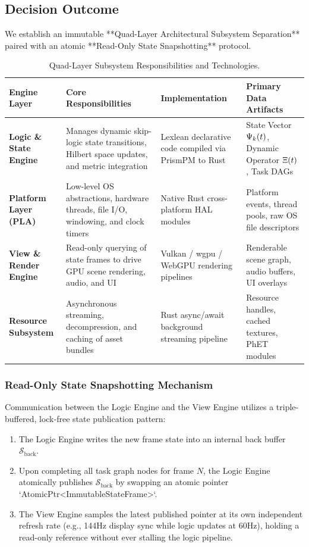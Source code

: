\subsection{Decision Outcome}
We establish an immutable **Quad-Layer Architectural Subsystem Separation** paired with an atomic **Read-Only State Snapshotting** protocol.

\begin{table}[htbp]
\centering
\small
\begin{tabularx}{\textwidth}{l p{4.2cm} p{3.8cm} X}
\toprule
\textbf{Engine Layer} & \textbf{Core Responsibilities} & \textbf{Implementation} & \textbf{Primary Data Artifacts} \\
\midrule
\textbf{Logic \& State Engine} & Manages dynamic skip-logic state transitions, Hilbert space updates, and metric integration & Lexlean declarative code compiled via PrismPM to Rust & State Vector $\Psi_k(t)$, Dynamic Operator $\Xi(t)$, Task DAGs \\
\addlinespace
\textbf{Platform Layer (PLA)} & Low-level OS abstractions, hardware threads, file I/O, windowing, and clock timers & Native Rust cross-platform HAL modules & Platform events, thread pools, raw OS file descriptors \\
\addlinespace
\textbf{View \& Render Engine} & Read-only querying of state frames to drive GPU scene rendering, audio, and UI & Vulkan / wgpu / WebGPU rendering pipelines & Renderable scene graph, audio buffers, UI overlays \\
\addlinespace
\textbf{Resource Subsystem} & Asynchronous streaming, decompression, and caching of asset bundles & Rust async/await background streaming pipeline & Resource handles, cached textures, PhET modules \\
\bottomrule
\end{tabularx}
\caption{Quad-Layer Subsystem Responsibilities and Technologies.}
\label{tab:subsystem_matrix}
\end{table}

\subsubsection{Read-Only State Snapshotting Mechanism}
Communication between the Logic Engine and the View Engine utilizes a triple-buffered, lock-free state publication pattern:
\begin{enumerate}
    \item The Logic Engine writes the new frame state into an internal back buffer $\mathcal{S}_{\text{back}}$.
    \item Upon completing all task graph nodes for frame $N$, the Logic Engine atomically publishes $\mathcal{S}_{\text{back}}$ by swapping an atomic pointer `AtomicPtr<ImmutableStateFrame>`.
    \item The View Engine samples the latest published pointer at its own independent refresh rate (e.g., 144Hz display sync while logic updates at 60Hz), holding a read-only reference without ever stalling the logic pipeline.
\end{enumerate}

